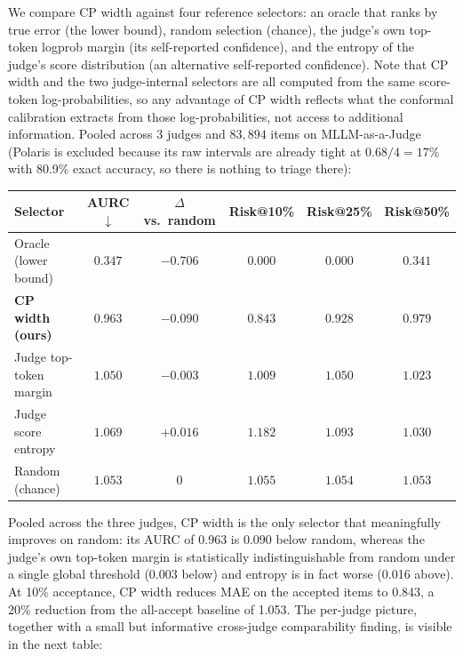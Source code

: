 \documentclass[11pt]{article}
\begin{document}
We compare CP width against four reference selectors: an oracle that ranks by true error (the lower bound), random selection (chance), the judge's own top-token logprob margin (its self-reported confidence), and the entropy of the judge's score distribution (an alternative self-reported confidence). Note that CP width and the two judge-internal selectors are all computed from the same score-token log-probabilities, so any advantage of CP width reflects what the conformal calibration extracts from those log-probabilities, not access to additional information. Pooled across 3 judges and $83{,}894$ items on MLLM-as-a-Judge (Polaris is excluded because its raw intervals are already tight at $0.68/4 = 17\%$ with 80.9\% exact accuracy, so there is nothing to triage there):

\begin{center}
\small
\begin{tabular}{lccccc}
\toprule
\textbf{Selector} & \textbf{AURC} $\downarrow$ & $\Delta$\textbf{ vs.\ random} & \textbf{Risk@10\%} & \textbf{Risk@25\%} & \textbf{Risk@50\%} \\
\midrule
Oracle (lower bound) & $0.347$ & $-0.706$ & $0.000$ & $0.000$ & $0.341$ \\
\textbf{CP width (ours)} & $\mathbf{0.963}$ & $\mathbf{-0.090}$ & $\mathbf{0.843}$ & $\mathbf{0.928}$ & $\mathbf{0.979}$ \\
Judge top-token margin & $1.050$ & $-0.003$ & $1.009$ & $1.050$ & $1.023$ \\
Judge score entropy & $1.069$ & $+0.016$ & $1.182$ & $1.093$ & $1.030$ \\
Random (chance) & $1.053$ & $0$ & $1.055$ & $1.054$ & $1.053$ \\
\bottomrule
\end{tabular}
\end{center}

Pooled across the three judges, CP width is the only selector that meaningfully improves on random: its AURC of 0.963 is 0.090 below random, whereas the judge's own top-token margin is statistically indistinguishable from random under a single global threshold (0.003 below) and entropy is in fact worse (0.016 above). At 10\% acceptance, CP width reduces MAE on the accepted items to 0.843, a 20\% reduction from the all-accept baseline of 1.053. The per-judge picture, together with a small but informative cross-judge comparability finding, is visible in the next table:
\end{document}
